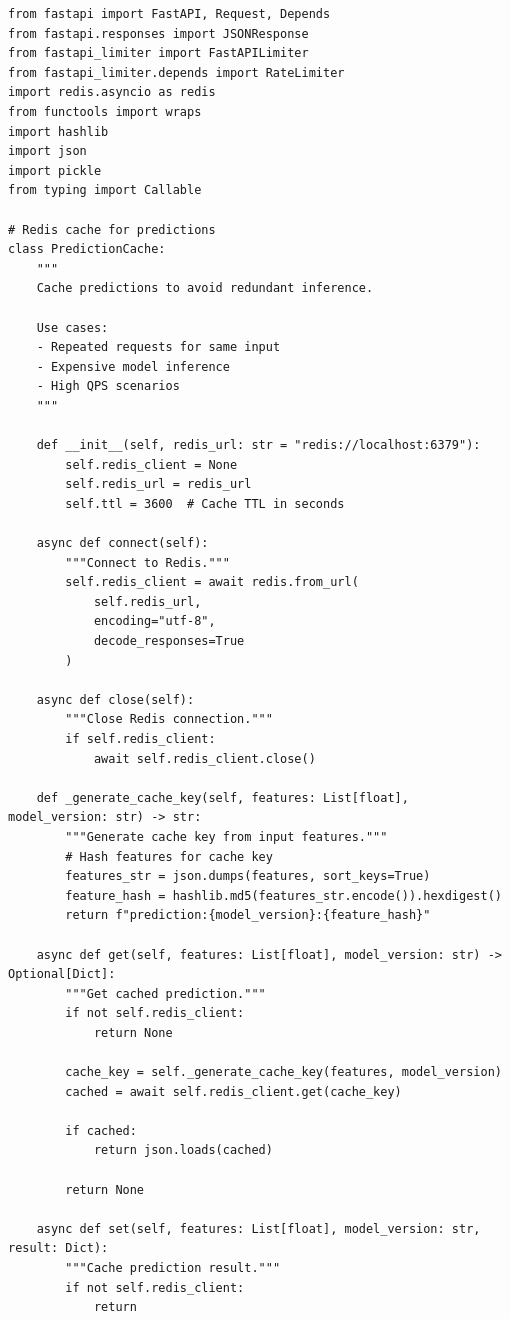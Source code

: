 \begin{lstlisting}[style=python, caption=Advanced serving features with caching and rate limiting]
from fastapi import FastAPI, Request, Depends
from fastapi.responses import JSONResponse
from fastapi_limiter import FastAPILimiter
from fastapi_limiter.depends import RateLimiter
import redis.asyncio as redis
from functools import wraps
import hashlib
import json
import pickle
from typing import Callable

# Redis cache for predictions
class PredictionCache:
    """
    Cache predictions to avoid redundant inference.

    Use cases:
    - Repeated requests for same input
    - Expensive model inference
    - High QPS scenarios
    """

    def __init__(self, redis_url: str = "redis://localhost:6379"):
        self.redis_client = None
        self.redis_url = redis_url
        self.ttl = 3600  # Cache TTL in seconds

    async def connect(self):
        """Connect to Redis."""
        self.redis_client = await redis.from_url(
            self.redis_url,
            encoding="utf-8",
            decode_responses=True
        )

    async def close(self):
        """Close Redis connection."""
        if self.redis_client:
            await self.redis_client.close()

    def _generate_cache_key(self, features: List[float], model_version: str) -> str:
        """Generate cache key from input features."""
        # Hash features for cache key
        features_str = json.dumps(features, sort_keys=True)
        feature_hash = hashlib.md5(features_str.encode()).hexdigest()
        return f"prediction:{model_version}:{feature_hash}"

    async def get(self, features: List[float], model_version: str) -> Optional[Dict]:
        """Get cached prediction."""
        if not self.redis_client:
            return None

        cache_key = self._generate_cache_key(features, model_version)
        cached = await self.redis_client.get(cache_key)

        if cached:
            return json.loads(cached)

        return None

    async def set(self, features: List[float], model_version: str, result: Dict):
        """Cache prediction result."""
        if not self.redis_client:
            return


\end{lstlisting}
